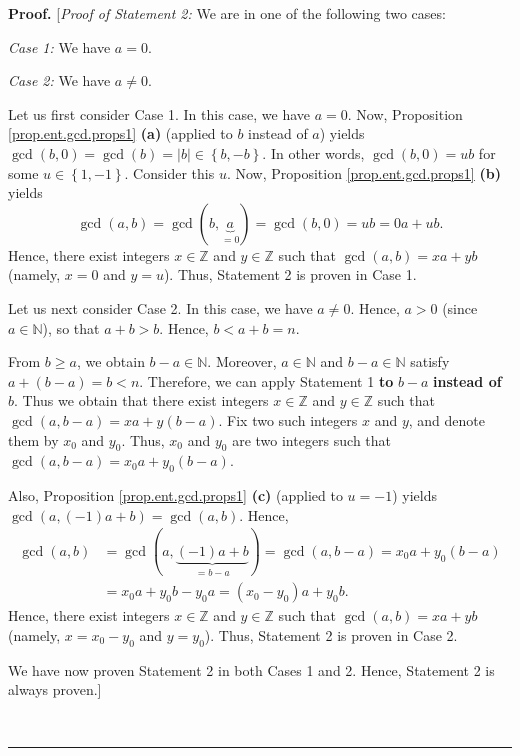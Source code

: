 \documentclass[numbers=enddot,12pt,final,onecolumn,notitlepage]{scrartcl}%
\numberwithin{exer}{subsection}
\theoremstyle{definition}
\newenvironment{proof}[1][Proof]{\noindent\textbf{#1.} }{\ \rule{0.5em}{0.5em}}
\begin{document}
\begin{proof}
[\textit{Proof of Statement 2:} We are in one of the following two cases:

\textit{Case 1:} We have $a=0$.

\textit{Case 2:} We have $a\neq0$.

Let us first consider Case 1. In this case, we have $a=0$. Now, Proposition
\ref{prop.ent.gcd.props1} \textbf{(a)} (applied to $b$ instead of $a$) yields
$\gcd\left(  b,0\right)  =\gcd\left(  b\right)  =\left\vert b\right\vert
\in\left\{  b,-b\right\}  $. In other words, $\gcd\left(  b,0\right)  =ub$ for
some $u\in\left\{  1,-1\right\}  $. Consider this $u$. Now, Proposition
\ref{prop.ent.gcd.props1} \textbf{(b)} yields%
\[
\gcd\left(  a,b\right)  =\gcd\left(  b,\underbrace{a}_{=0}\right)
=\gcd\left(  b,0\right)  =ub=0a+ub.
\]
Hence, there exist integers $x\in\mathbb{Z}$ and $y\in\mathbb{Z}$ such that
$\gcd\left(  a,b\right)  =xa+yb$ (namely, $x=0$ and $y=u$). Thus, Statement 2
is proven in Case 1.

Let us next consider Case 2. In this case, we have $a\neq0$. Hence, $a>0$
(since $a\in\mathbb{N}$), so that $a+b>b$. Hence, $b<a+b=n$.

From $b\geq a$, we obtain $b-a\in\mathbb{N}$. Moreover, $a\in\mathbb{N}$ and
$b-a\in\mathbb{N}$ satisfy $a+\left(  b-a\right)  =b<n$. Therefore, we can
apply Statement 1 \textbf{to }$b-a$ \textbf{instead of }$b$. Thus we obtain
that there exist integers $x\in\mathbb{Z}$ and $y\in\mathbb{Z}$ such that
$\gcd\left(  a,b-a\right)  =xa+y\left(  b-a\right)  $. Fix two such integers
$x$ and $y$, and denote them by $x_{0}$ and $y_{0}$. Thus, $x_{0}$ and $y_{0}$
are two integers such that $\gcd\left(  a,b-a\right)  =x_{0}a+y_{0}\left(
b-a\right)  $.

Also, Proposition \ref{prop.ent.gcd.props1} \textbf{(c)} (applied to $u=-1$)
yields $\gcd\left(  a,\left(  -1\right)  a+b\right)  =\gcd\left(  a,b\right)
$. Hence,%
\begin{align*}
\gcd\left(  a,b\right)   &  =\gcd\left(  a,\underbrace{\left(  -1\right)
a+b}_{=b-a}\right)  =\gcd\left(  a,b-a\right)  =x_{0}a+y_{0}\left(  b-a\right)
\\
&  =x_{0}a+y_{0}b-y_{0}a=\left(  x_{0}-y_{0}\right)  a+y_{0}b.
\end{align*}
Hence, there exist integers $x\in\mathbb{Z}$ and $y\in\mathbb{Z}$ such that
$\gcd\left(  a,b\right)  =xa+yb$ (namely, $x=x_{0}-y_{0}$ and $y=y_{0}$).
Thus, Statement 2 is proven in Case 2.

We have now proven Statement 2 in both Cases 1 and 2. Hence, Statement 2 is
always proven.]


\end{proof}
\end{document}
